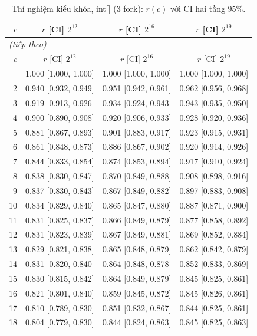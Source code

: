 \footnotesize
\begin{longtable}{rccc}
\caption{Thí nghiệm kiểu khóa, int[] (3 fork): $r(c)$ với CI hai tầng 95\%.}\label{tab:d3_full_int}\\
\toprule
$c$ & $r$ [CI] $2^{12}$ & $r$ [CI] $2^{16}$ & $r$ [CI] $2^{19}$ \\
\midrule
\endfirsthead
\multicolumn{4}{l}{\textit{(tiếp theo)}}\\
\toprule
$c$ & $r$ [CI] $2^{12}$ & $r$ [CI] $2^{16}$ & $r$ [CI] $2^{19}$ \\
\midrule
\endhead
\bottomrule
\endlastfoot
1 & 1.000 [1.000, 1.000] & 1.000 [1.000, 1.000] & 1.000 [1.000, 1.000] \\
2 & 0.940 [0.932, 0.949] & 0.951 [0.942, 0.961] & 0.962 [0.956, 0.968] \\
3 & 0.919 [0.913, 0.926] & 0.934 [0.924, 0.943] & 0.943 [0.935, 0.950] \\
4 & 0.900 [0.890, 0.908] & 0.920 [0.906, 0.933] & 0.928 [0.920, 0.936] \\
5 & 0.881 [0.867, 0.893] & 0.901 [0.883, 0.917] & 0.923 [0.915, 0.931] \\
6 & 0.861 [0.848, 0.873] & 0.886 [0.867, 0.902] & 0.920 [0.914, 0.926] \\
7 & 0.844 [0.833, 0.854] & 0.874 [0.853, 0.894] & 0.917 [0.910, 0.924] \\
8 & 0.838 [0.830, 0.847] & 0.870 [0.849, 0.888] & 0.908 [0.898, 0.916] \\
9 & 0.837 [0.830, 0.843] & 0.867 [0.849, 0.882] & 0.897 [0.883, 0.908] \\
10 & 0.834 [0.829, 0.840] & 0.865 [0.847, 0.880] & 0.887 [0.871, 0.900] \\
11 & 0.831 [0.825, 0.837] & 0.866 [0.849, 0.879] & 0.877 [0.858, 0.892] \\
12 & 0.831 [0.823, 0.839] & 0.867 [0.849, 0.881] & 0.869 [0.852, 0.884] \\
13 & 0.829 [0.821, 0.838] & 0.865 [0.848, 0.879] & 0.862 [0.842, 0.879] \\
14 & 0.831 [0.820, 0.840] & 0.864 [0.848, 0.878] & 0.852 [0.833, 0.869] \\
15 & 0.830 [0.815, 0.842] & 0.864 [0.849, 0.879] & 0.845 [0.825, 0.861] \\
16 & 0.821 [0.801, 0.840] & 0.859 [0.845, 0.872] & 0.845 [0.826, 0.861] \\
17 & 0.810 [0.789, 0.830] & 0.851 [0.832, 0.867] & 0.844 [0.825, 0.861] \\
18 & 0.804 [0.779, 0.830] & 0.844 [0.824, 0.863] & 0.845 [0.825, 0.863] \\

\end{longtable}

